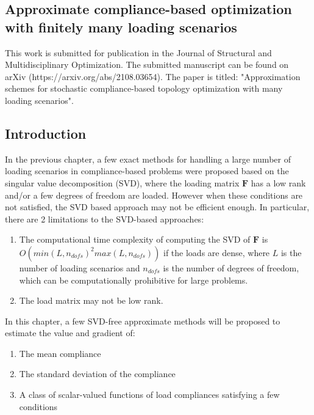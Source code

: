 \begin{titlepage}\centering
\vspace*{\fill}

\chapter{Approximate compliance-based optimization with finitely many loading scenarios}\thispagestyle{EmptyHeader}
\label{chp:4}

\begin{tcolorbox}
This work is submitted for publication in the Journal of Structural and Multidisciplinary Optimization. The submitted manuscript can be found on arXiv (https://arxiv.org/abs/2108.03654). The paper is titled: "Approximation schemes for stochastic compliance-based topology optimization with many loading scenarios".
\end{tcolorbox}

\vspace*{\fill}
\end{titlepage}


\section{Introduction}

In the previous chapter, a few exact methods for handling a large number of loading scenarios in compliance-based problems were proposed based on the singular value decomposition (SVD), where the loading matrix $\bm{F}$ has a low rank and/or a few degrees of freedom are loaded. However when these conditions are not satisfied, the SVD based approach may not be efficient enough. In particular, there are 2 limitations to the SVD-based approaches:
\begin{enumerate}
  \item The computational time complexity of computing the SVD of $\bm{F}$ is \newline $O(min(L, n_{dofs})^2 max(L, n_{dofs}))$ if the loads are dense, where $L$ is the number of loading scenarios and $n_{dofs}$ is the number of degrees of freedom, which can be computationally prohibitive for large problems.
  \item The load matrix may not be low rank.
\end{enumerate}

In this chapter, a few SVD-free approximate methods will be proposed to estimate the value and gradient of:
\begin{enumerate}
    \item The mean compliance
    \item The standard deviation of the compliance
    \item A class of scalar-valued functions of load compliances satisfying a few conditions
\end{enumerate}

